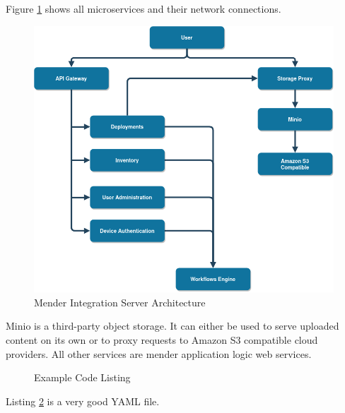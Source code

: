 Figure \ref{fig:mender-integration} shows all microservices and their network connections.
\begin{figure}
    \centering
    \includegraphics[scale=0.5]{images/integration-app.png}
    \caption{Mender Integration Server Architecture}
    \label{fig:mender-integration}
\end{figure}
Minio is a third-party object storage. It can either be used to serve uploaded content on its own or to proxy requests to Amazon S3 compatible cloud providers. All other services are mender application logic web services.
\newpage

\begin{figure}
    \caption{Example Code Listing}
    \label{code:example-label}
\end{figure}

Listing \ref{code:example-label} is a very good YAML file.
